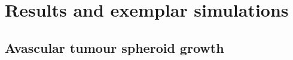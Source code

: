 \documentclass[superscriptaddress, a4paper]{article}
\begin{document}
\section{Results and exemplar simulations}
\label{sec:results}

\subsection{Avascular tumour spheroid growth}
\label{sec:avascular tumour spheroid growth}
\end{document}
